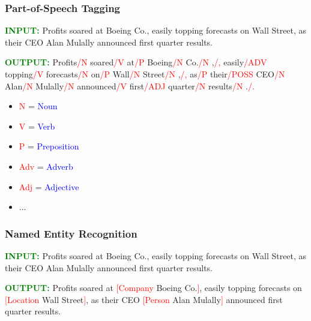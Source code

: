 \documentclass[handout]{beamer}
\begin{document}
\begin{frame}
  \frametitle{Part-of-Speech Tagging}
  \scriptsize
  \textcolor{green}{\textbf{INPUT:}}
  Profits soared at Boeing Co., easily topping forecasts on Wall Street, as their CEO Alan Mulally announced first quarter results.  \vspace{0.5cm}
  
  \textcolor{green}{\textbf{OUTPUT:}}
  Profits\textcolor{red}{/N} soared\textcolor{red}{/V} at\textcolor{red}{/P} Boeing\textcolor{red}{/N} Co.\textcolor{red}{/N} ,\textcolor{red}{/,} easily\textcolor{red}{/ADV} topping\textcolor{red}{/V} forecasts\textcolor{red}{/N} on\textcolor{red}{/P} Wall\textcolor{red}{/N} Street\textcolor{red}{/N} ,\textcolor{red}{/,} as\textcolor{red}{/P} their\textcolor{red}{/POSS} CEO\textcolor{red}{/N} Alan\textcolor{red}{/N} Mulally\textcolor{red}{/N} announced\textcolor{red}{/V} first\textcolor{red}{/ADJ} quarter\textcolor{red}{/N} results\textcolor{red}{/N} .\textcolor{red}{/.}
   \vspace{0.5cm}
  \begin{itemize}
    \item \textcolor{red}{N} = \textcolor{blue}{Noun}
    \item \textcolor{red}{V} = \textcolor{blue}{Verb}
    \item \textcolor{red}{P} = \textcolor{blue}{Preposition}
    \item \textcolor{red}{Adv} = \textcolor{blue}{Adverb}
    \item \textcolor{red}{Adj} = \textcolor{blue}{Adjective}
    \item ...
  \end{itemize}
\end{frame}

\begin{frame}
  \frametitle{Named Entity Recognition}
  \textcolor{green}{\textbf{INPUT:}}
  Profits soared at Boeing Co., easily topping forecasts on Wall Street, as their CEO Alan Mulally announced first quarter results.    \vspace{0.5cm}

  \textcolor{green}{\textbf{OUTPUT:}}
  Profits soared at \textcolor{red}{[Company} Boeing Co.\textcolor{red}{]}, easily topping forecasts on \textcolor{red}{[Location} Wall Street\textcolor{red}{]}, as their CEO \textcolor{red}{[Person} Alan Mulally\textcolor{red}{]} announced first quarter results.
\end{frame}
\end{document}
